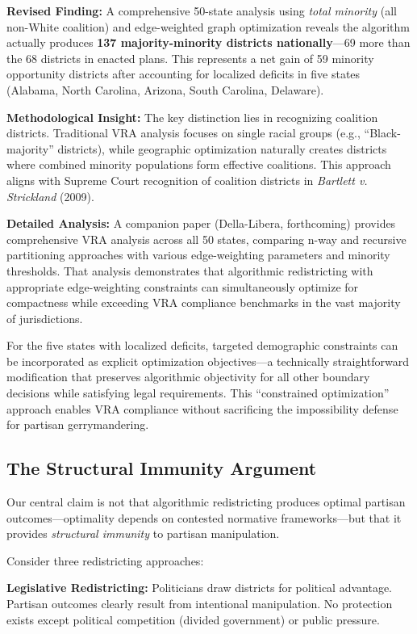 \textbf{Revised Finding:} A comprehensive 50-state analysis using \textit{total minority} (all non-White coalition) and edge-weighted graph optimization reveals the algorithm actually produces \textbf{137 majority-minority districts nationally}—69 more than the 68 districts in enacted plans. This represents a net gain of 59 minority opportunity districts after accounting for localized deficits in five states (Alabama, North Carolina, Arizona, South Carolina, Delaware).

\textbf{Methodological Insight:} The key distinction lies in recognizing coalition districts. Traditional VRA analysis focuses on single racial groups (e.g., ``Black-majority'' districts), while geographic optimization naturally creates districts where combined minority populations form effective coalitions. This approach aligns with Supreme Court recognition of coalition districts in \textit{Bartlett v. Strickland} (2009).

\textbf{Detailed Analysis:} A companion paper (Della-Libera, forthcoming) provides comprehensive VRA analysis across all 50 states, comparing n-way and recursive partitioning approaches with various edge-weighting parameters and minority thresholds. That analysis demonstrates that algorithmic redistricting with appropriate edge-weighting constraints can simultaneously optimize for compactness while exceeding VRA compliance benchmarks in the vast majority of jurisdictions.

For the five states with localized deficits, targeted demographic constraints can be incorporated as explicit optimization objectives—a technically straightforward modification that preserves algorithmic objectivity for all other boundary decisions while satisfying legal requirements. This ``constrained optimization'' approach enables VRA compliance without sacrificing the impossibility defense for partisan gerrymandering.

\subsection{The Structural Immunity Argument}

Our central claim is not that algorithmic redistricting produces optimal partisan outcomes—optimality depends on contested normative frameworks—but that it provides \textit{structural immunity} to partisan manipulation.

Consider three redistricting approaches:

\textbf{Legislative Redistricting:} Politicians draw districts for political advantage. Partisan outcomes clearly result from intentional manipulation. No protection exists except political competition (divided government) or public pressure.

